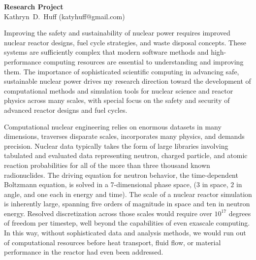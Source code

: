 \documentclass[a4paper, 10pt]{article}
\makeatletter
\newcommand{\authorname}{Kathryn~D.~Huff }
\newcommand{\authoremail}{katyhuff@gmail.com}
\newcommand{\authorsite}{katyhuff.github.com}
\makeatother
\begin{document}
\pagestyle{fancy}
\lhead{\textcolor{gray}{\it \authorname}}
\rhead{\textcolor{gray}{\thepage/\totalpages{}}}
\renewcommand{\headrulewidth}{0pt} 
\renewcommand{\footrulewidth}{0pt} 
\fancyfoot[C]{\footnotesize \textcolor{gray}{\authorsite}} 

\begin{center}
{\LARGE \bf Research Project}\\
\vspace*{0.1cm}
{\normalsize \authorname (\authoremail)}
\end{center}




Improving the safety and sustainability of nuclear power requires improved 
nuclear reactor designs, fuel cycle strategies, and waste disposal concepts.  
These systems are sufficiently complex that modern software methods and 
high-performance computing resources are essential to understanding and 
improving them. The importance of sophisticated scientific computing in 
advancing safe, sustainable nuclear power drives my research direction toward 
the development of computational methods and simulation tools for nuclear 
science and  reactor physics across many scales, with special focus on the 
safety and security of advanced reactor designs and fuel cycles.

Computational nuclear engineering relies on enormous datasets in many 
dimensions, traverses disparate scales, incorporates many physics, and demands 
precision.  Nuclear data typically takes the form of large libraries involving 
tabulated and evaluated data representing neutron, charged particle, and atomic 
reaction probabilities for all of the more than three thousand known 
radionuclides.  The driving equation for neutron behavior, the time-dependent 
Boltzmann equation, is solved in a 7-dimensional phase space, ($3$ in space, $2$ 
in angle, and one each in energy and time). The scale of a nuclear reactor 
simulation is inherently large, spanning five orders of magnitude in space and 
ten in neutron energy. Resolved discretization across those scales would require 
over $10^{17}$ degrees of freedom per timestep, well beyond the
capabilities of even exascale computing. In this way, without sophisticated
data and analysis methods, we would run out of computational resources before
heat transport, fluid flow, or material performance in the reactor had even
been addressed. 
\end{document}

